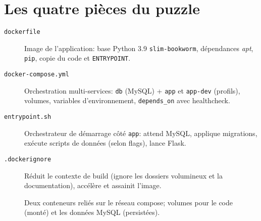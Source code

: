 \section{Les quatre pièces du puzzle}

\begin{description}
  \item[\texttt{dockerfile}] Image de l'application: base Python 3.9 \texttt{slim-bookworm}, dépendances \textit{apt}, \texttt{pip}, copie du code et \texttt{ENTRYPOINT}.
  \item[\texttt{docker-compose.yml}] Orchestration multi-services: \texttt{db} (MySQL) + \texttt{app} et \texttt{app-dev} (profils), volumes, variables d'environnement, \texttt{depends\_on} avec healthcheck.
  \item[\texttt{entrypoint.sh}] Orchestrateur de démarrage côté \texttt{app}: attend MySQL, applique migrations, exécute scripts de données (selon flags), lance Flask.
  \item[\texttt{.dockerignore}] Réduit le contexte de build (ignore les dossiers volumineux et la documentation), accélère et assainit l'image.
\end{description}


\begin{figure}[H]
  \centering
  \caption[Architecture Docker (app+db)]{Deux conteneurs reliés sur le réseau compose; volumes pour le code (monté) et les données MySQL (persistées).}
\end{figure}

